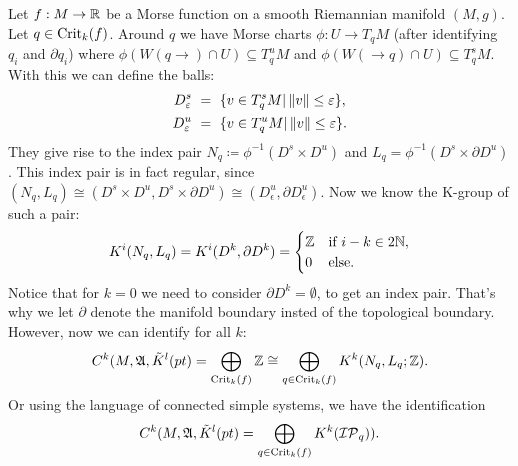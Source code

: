 \begin{remark} \label{ex: Critical points as isolated compact invariant subsets}
	Let ${f:M\to \mathbb{R}}$ be a Morse function on a smooth Riemannian manifold $(M,g)$. Let $q\in \mathrm{Crit}_k(f)$. Around $q$ we have Morse charts $\phi:U \to T_qM$ (after identifying $q_i$ and $\partial q_i$) where  ${\phi(W(q\to)\cap U)\subseteq T_q^{u}M}$ and ${\phi(W(\to q)\cap U)\subseteq T_q^{s}M}$. With this we can define the balls:
	\begin{align*}
		D^{s}_\varepsilon &~=~\{v\in T_q^{s}M | \left\lVert v\right\rVert\leq \varepsilon \}, \\
		D^{u}_\varepsilon &~=~\{v\in T_q^{u }M | \left\lVert v\right\rVert\leq \varepsilon \}. 
	\end{align*} They give rise to the index pair $N_q\coloneq\phi^{-1}( D^{s }\times  D^{u })$ and $L_q=\phi^{-1}( D^{ s}\times \partial D^{u})$. This index pair is in fact regular, since $(N_q,L_q)\cong  (D^{ s}\times  D^{u }, D^{s}\times \partial D^{u}) \cong (D^{u}_{\epsilon},\partial D^{u}_{\epsilon} )$. Now we know the K-group of such a pair:
	\begin{align} \label{eq: homology of indexx pair of critical point}
		K^i(N_q,L_q)=K^i(D^{k},\partial D^{k})=\begin{cases}
			\mathbb{Z} & \text{if } i-k\in 2\mathbb{N},\\
			0& \text{else. }
		\end{cases}
	\end{align}
	Notice that for $k=0$ we need to consider $\partial D^k=\emptyset$, to get an index pair. That's why we let $\partial$ denote the manifold boundary insted of the topological boundary. However, now we can identify for all $k$: \begin{equation} \label{ kritical points as direct sum of homology groups}
		C^{k}(M,\mathfrak{A},\tilde{K}^{l}(pt)=\bigoplus_{ \mathrm{Crit}_k(f)} \mathbb{Z} \cong \bigoplus_{q\in \mathrm{Crit}_k(f)} K^k(N_q,L_q;\mathbb{Z}).
	\end{equation}
	Or using the language of connected simple systems, we have the identification 
	\begin{equation} 
		C^{k}(M,\mathfrak{A},\tilde{K}^{l}(pt)= \bigoplus_{q\in \mathrm{Crit}_k(f)} K^k(\mathcal{IP}_q)).
	\end{equation}
\end{remark}

